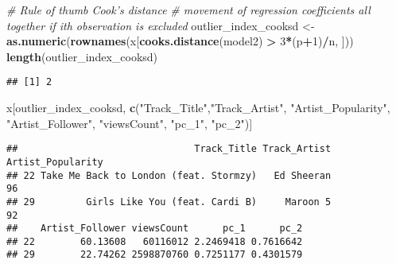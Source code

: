 \documentclass[
]{article}
\newenvironment{Shaded}{\begin{snugshade}}{\end{snugshade}}
\newcommand{\CommentTok}[1]{\textcolor[rgb]{0.56,0.35,0.01}{\textit{#1}}}
\newcommand{\DecValTok}[1]{\textcolor[rgb]{0.00,0.00,0.81}{#1}}
\newcommand{\KeywordTok}[1]{\textcolor[rgb]{0.13,0.29,0.53}{\textbf{#1}}}
\newcommand{\NormalTok}[1]{#1}
\newcommand{\OperatorTok}[1]{\textcolor[rgb]{0.81,0.36,0.00}{\textbf{#1}}}
\newcommand{\StringTok}[1]{\textcolor[rgb]{0.31,0.60,0.02}{#1}}
\begin{document}
\begin{Shaded}
\begin{Highlighting}[]
\CommentTok{# Rule of thumb Cook's distance}
\CommentTok{# movement of regression coefficients all together if ith observation is excluded}
\NormalTok{outlier_index_cooksd <-}\StringTok{ }\KeywordTok{as.numeric}\NormalTok{(}\KeywordTok{rownames}\NormalTok{(x[}\KeywordTok{cooks.distance}\NormalTok{(model2) }\OperatorTok{>}\StringTok{ }\DecValTok{3}\OperatorTok{*}\NormalTok{(p}\OperatorTok{+}\DecValTok{1}\NormalTok{)}\OperatorTok{/}\NormalTok{n, ]))}
\KeywordTok{length}\NormalTok{(outlier_index_cooksd)}
\end{Highlighting}
\end{Shaded}

\begin{verbatim}
## [1] 2
\end{verbatim}

\begin{Shaded}
\begin{Highlighting}[]
\NormalTok{x[outlier_index_cooksd, }\KeywordTok{c}\NormalTok{(}\StringTok{"Track_Title"}\NormalTok{,}\StringTok{"Track_Artist"}\NormalTok{, }\StringTok{"Artist_Popularity"}\NormalTok{, }\StringTok{"Artist_Follower"}\NormalTok{, }\StringTok{"viewsCount"}\NormalTok{, }\StringTok{"pc_1"}\NormalTok{,}
                            \StringTok{"pc_2"}\NormalTok{)]}
\end{Highlighting}
\end{Shaded}

\begin{verbatim}
##                               Track_Title Track_Artist Artist_Popularity
## 22 Take Me Back to London (feat. Stormzy)   Ed Sheeran                96
## 29         Girls Like You (feat. Cardi B)     Maroon 5                92
##    Artist_Follower viewsCount      pc_1      pc_2
## 22        60.13608   60116012 2.2469418 0.7616642
## 29        22.74262 2598870760 0.7251177 0.4301579
\end{verbatim}
\end{document}
